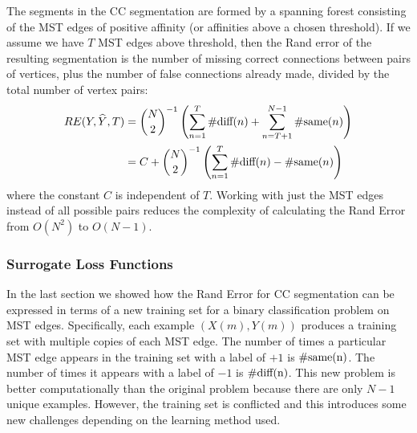 \documentclass[letterpaper,twocolumn,fleqn]{article}
\begin{document}
The segments in the CC segmentation are formed by a spanning forest consisting of the MST edges of positive affinity (or affinities above a chosen threshold). If we assume we have $T$ MST edges above threshold, then the Rand error of the resulting segmentation is the number of missing correct connections between pairs of vertices, plus the number of false connections already made, divided by the total number of vertex pairs:
\begin{equation}
\label{eq::rand}
\begin{split}
RE(Y,\widehat{Y}, T)&=\binom{N}{2}^{-1}\left(\sum_{n=1}^T \#\hbox{diff}(n)+\sum_{n=T+1}^{N-1} \#\hbox{same}(n)\right)\\
&= C + \binom{N}{2}^{-1}\left(\sum_{n=1}^T \#\hbox{diff}(n)- \#\hbox{same}(n)\right)\\
\end{split}
\end{equation}
where the constant $C$ is independent of $T$. 
Working with just the MST edges instead of all possible pairs reduces the complexity of calculating the Rand Error from $O(N^2)$ to $O(N-1)$. 

\subsubsection{Surrogate Loss Functions}
In the last section we showed how the Rand Error for CC segmentation can be expressed in terms of a new training set for a binary classification problem on MST edges. Specifically, each example $(X(m),Y(m))$ produces a training set with multiple copies of each MST edge. The number of times a particular MST edge appears in the training set with a label of $+1$ is $\#\hbox{same(n)}$. The number of times it appears with a label of $-1$ is $\#\hbox{diff(n)}$. This new problem is better computationally than the original problem because there are only $N-1$ unique examples. However, the training set is conflicted and this introduces some new challenges depending on the learning method used.
\end{document}
